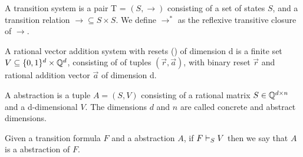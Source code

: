 \begin{mydef}
A transition system is a pair T = $(S, \rightarrow)$ consisting of a set of states $S$, and a transition relation $\rightarrow \subseteq S \times S$. We define $\rightarrow^*$ as the reflexive transitive closure of $\rightarrow$.
\end{mydef}

\begin{mydef}
A rational vector addition system with resets (\qvasr) of dimension d is a finite set $V \subseteq \{0, 1\}^d \times \mathbb{Q}^d$, consisting of of tuples $(\vec{r}, \vec{a})$, with binary reset $\vec{r}$ and rational addition vector $\vec{a}$ of dimension d.
\end{mydef}

\begin{mydef}
A \qvasr abstraction is a tuple $A = (S, V)$ consisting of a rational matrix $S \in \mathbb{Q}^{d \times n}$ and a d-dimensional \qvasr $V$. The dimensions $d$ and $n$ are called concrete and abstract dimensions.
\end{mydef}

Given a transition formula $F$ and a \qvasr abstraction $A$, if $F \vdash_{S} V$ then we say that $A$ is a \qvasr abstraction of $F$.
